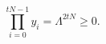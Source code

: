 \begin{equation}
\prod \limits_{i=0}^{tN-1} y_i = \Lambda^{2tN} \geq 0.
\label{LagrangetN}
\end{equation}

